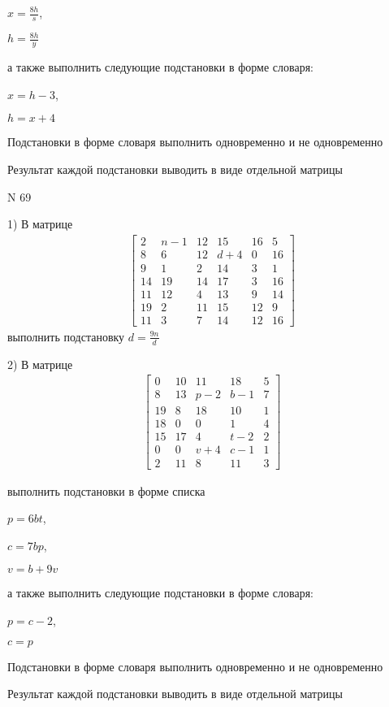 \documentclass[11pt]{report}
\begin{document}
$x=\frac{8 h}{s}$,

$h=\frac{8 h}{y}$

а также выполнить следующие подстановки в форме словаря:

$x=h - 3$,

$h=x + 4$


    Подстановки в форме словаря выполнить одновременно и не одновременно


    Результат каждой подстановки выводить в виде отдельной матрицы

\newpage
N 69


    1) В матрице
\begin{align*}
\left[\begin{matrix}2 & n - 1 & 12 & 15 & 16 & 5\\8 & 6 & 12 & d + 4 & 0 & 16\\9 & 1 & 2 & 14 & 3 & 1\\14 & 19 & 14 & 17 & 3 & 16\\11 & 12 & 4 & 13 & 9 & 14\\19 & 2 & 11 & 15 & 12 & 9\\11 & 3 & 7 & 14 & 12 & 16\end{matrix}\right]
\end{align*}
выполнить подстановку $d=\frac{9 n}{d}$


    2) В матрице
\begin{align*}
\left[\begin{matrix}0 & 10 & 11 & 18 & 5\\8 & 13 & p - 2 & b - 1 & 7\\19 & 8 & 18 & 10 & 1\\18 & 0 & 0 & 1 & 4\\15 & 17 & 4 & t - 2 & 2\\0 & 0 & v + 4 & c - 1 & 1\\2 & 11 & 8 & 11 & 3\end{matrix}\right]
\end{align*}

выполнить подстановки в форме списка

$p=6 b t$,

$c=7 b p$,

$v=b + 9 v$

а также выполнить следующие подстановки в форме словаря:

$p=c - 2$,

$c=p$


    Подстановки в форме словаря выполнить одновременно и не одновременно


    Результат каждой подстановки выводить в виде отдельной матрицы
\end{document}

